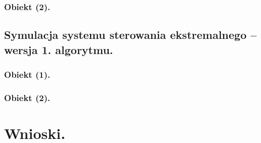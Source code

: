 \documentclass[a4paper,10pt]{article}
\begin{document}

\subsubsection{Obiekt (2).}

\subsection{Symulacja systemu sterowania ekstremalnego – wersja 1. algorytmu.}

\subsubsection{Obiekt (1).}

\subsubsection{Obiekt (2).}
\section{Wnioski.}\label{sec:wnioski}
\end{document}
